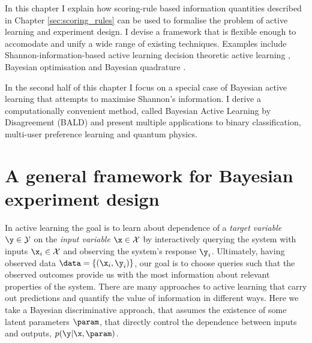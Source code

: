 In this chapter I explain how scoring-rule based information quantities described in Chapter \ref{sec:scoring_rules} can be used to formalise the problem of active learning and experiment design. I devise a framework that is flexible enough to accomodate and unify a wide range of existing techniques. Examples include Shannon-information-based active learning \citep{Krause2006,MacKay1992,Houlsby2011} decision theoretic active learning \citep{Kapoor2007,Zhu2003active}, Bayesian optimisation \citep{Hennig2012entropy,Hennig2012newton} and Bayesian quadrature \citep{BZHermiteQuadrature,BZMonteCarlo}.

In the second half of this chapter I focus on a special case of Bayesian active learning that attempts to maximise Shannon's information. I derive a computationally convenient method, called Bayesian Active Learning by Disagreement (BALD) and present multiple applications to binary classification, multi-user preference learning and quantum physics.

                                                      
\section{A general framework for Bayesian experiment design}

In active learning the goal is to learn about dependence of a \emph{target variable} $\y\in\mathcal{Y}$ on the \emph{input variable} $\x\in\mathcal{X}$ by interactively querying the system with inputs $\x_i\in\mathcal{X}$ and observing the system's response $\y_i$. Ultimately, having observed data $\data = \{(\x_i,\y_i)\}$, our goal is to choose queries such that the observed outcomes provide us with the most information about relevant properties of the system. There are many approaches to active learning that carry out predictions and quantify the value of information in different ways. Here we take a Bayesian discriminative approach, that assumes the existence of some latent parameters $\param$, that directly control the dependence between inputs and outputs, $p(\y\vert\x,\param)$.

